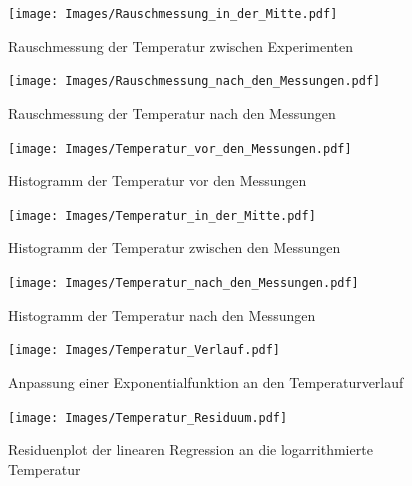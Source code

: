 \documentclass[]{article}
\begin{document}
	\begin{figure}
	\begin{center}
		\texttt{[image: Images/Rauschmessung\_in\_der\_Mitte.pdf]}
		\caption{Rauschmessung der Temperatur zwischen Experimenten}
		\label{Temp_mitte}
	\end{center}
	\end{figure}

	\begin{figure}
	\begin{center}
		\texttt{[image: Images/Rauschmessung\_nach\_den\_Messungen.pdf]}
		\caption{Rauschmessung der Temperatur nach den Messungen}
		\label{Temp_hinten}
	\end{center}
	\end{figure}

	\begin{figure}
	\begin{center}
		\texttt{[image: Images/Temperatur\_vor\_den\_Messungen.pdf]}
		\caption{Histogramm der Temperatur vor den Messungen}
		\label{Temp_vorn_hist}
	\end{center}
	\end{figure}

	\begin{figure}
	\begin{center}
		\texttt{[image: Images/Temperatur\_in\_der\_Mitte.pdf]}
		\caption{Histogramm der Temperatur zwischen den Messungen}
		\label{Temp_mitte_hist}
	\end{center}
	\end{figure}

	\begin{figure}
	\begin{center}
		\texttt{[image: Images/Temperatur\_nach\_den\_Messungen.pdf]}
		\caption{Histogramm der Temperatur nach den Messungen}
		\label{Temp_hinten_hist}
	\end{center}
	\end{figure}

	\begin{figure}
	\begin{center}
		\texttt{[image: Images/Temperatur\_Verlauf.pdf]}
		\caption{Anpassung einer Exponentialfunktion an den Temperaturverlauf}
		\label{Temp_Fit}
	\end{center}
	\end{figure}

	\begin{figure}
	\begin{center}
		\texttt{[image: Images/Temperatur\_Residuum.pdf]}
		\caption{Residuenplot der linearen Regression an die logarrithmierte Temperatur}
		\label{Temp_Res}
	\end{center}
	\end{figure}
\end{document}
